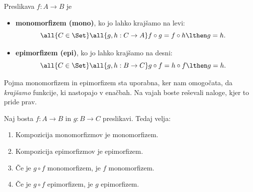 \begin{definicija}
  Preslikava $f : A \to B$ je
  \begin{itemize}
  \item \textbf{monomorfizem (mono)}, ko jo lahko krajšamo na levi:
    \begin{equation*}
      \all{C \in \Set} \all{g, h : C \to A} f \circ g = f \circ h \lthen g = h.
    \end{equation*}

   \item \textbf{epimorfizem (epi)}, ko jo lahko krajšamo na desni:
     \begin{equation*}
      \all{C \in \Set} \all{g, h : B \to C} g \circ f = h \circ f \lthen g = h.
    \end{equation*}
  \end{itemize}
\end{definicija}

Pojma monomorfizem in epimorfizem sta uporabna, ker nam omogočata, da \emph{krajšamo} funkcije, ki nastopajo v enačbah. Na vajah boste reševali naloge, kjer to pride prav.

\begin{izrek}
  \label{izr:epi-mono-comp}
  Naj bosta $f : A \to B$ in $g : B \to C$ preslikavi. Tedaj velja:
  \begin{enumerate}
  \item Kompozicija monomorfizmov je monomorfizem.
  \item Kompozicija epimorfizmov je epimorfizem.
  \item Če je $g \circ f$ monomorfizem, je $f$ monomorfizem.
  \item Če je $g \circ f$ epimorfizem, je $g$ epimorfizem.
  \end{enumerate}
\end{izrek}

